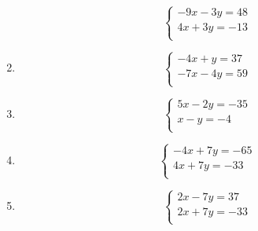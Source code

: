 \documentclass[24 pt]{article}
\begin{document}
\begin{enumerate}
\begin{equation*}
\begin{cases}
-9x-3y=48\\
4x+3y=-13\\
\end{cases}
\end{equation*}
\item
\begin{equation*}
\begin{cases}
-4x+y=37\\
-7x-4y=59\\
\end{cases}
\end{equation*}
\item
\begin{equation*}
\begin{cases}
5x-2y=-35\\
x-y=-4\\
\end{cases}
\end{equation*}
\item
\begin{equation*}
\begin{cases}
-4x+7y=-65\\
4x+7y=-33\\
\end{cases}
\end{equation*}
\item
\begin{equation*}
\begin{cases}
2x-7y=37\\
2x+7y=-33\\
\end{cases}
\end{equation*}
\end{enumerate}
\end{document}
